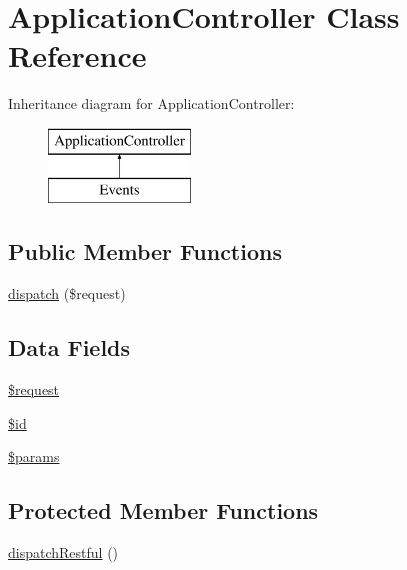 \hypertarget{class_application_controller}{\section{\-Application\-Controller \-Class \-Reference}
\label{class_application_controller}
}
\-Inheritance diagram for \-Application\-Controller\-:\begin{figure}[H]
\begin{center}
\leavevmode
\includegraphics[height=2.000000cm]{class_application_controller}
\end{center}
\end{figure}
\subsection*{\-Public \-Member \-Functions}
\begin{DoxyCompactItemize}
\item 
\hyperlink{class_application_controller_aec484c18976d236f8ff24e190d80e1e4}{dispatch} (\$request)
\end{DoxyCompactItemize}
\subsection*{\-Data \-Fields}
\begin{DoxyCompactItemize}
\item 
\hyperlink{class_application_controller_abb35c8495a232b510389fa6d7b15d38a}{\$request}
\item 
\hyperlink{class_application_controller_ae97941710d863131c700f069b109991e}{\$id}
\item 
\hyperlink{class_application_controller_afe68e6fbe7acfbffc0af0c84a1996466}{\$params}
\end{DoxyCompactItemize}
\subsection*{\-Protected \-Member \-Functions}
\begin{DoxyCompactItemize}
\item 
\hyperlink{class_application_controller_a9219fb6823400903d8e2023e3ca62527}{dispatch\-Restful} ()
\end{DoxyCompactItemize}



